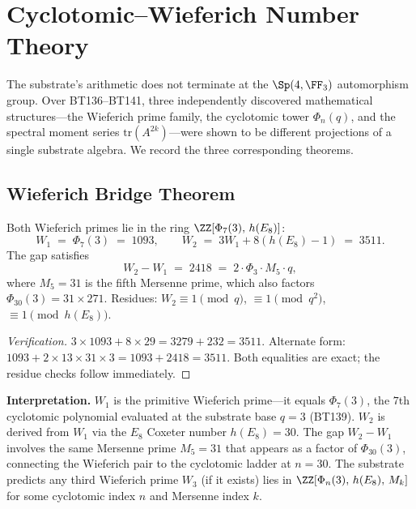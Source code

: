 
\section{Cyclotomic--Wieferich Number Theory}

The substrate's arithmetic does not terminate at the $\Sp(4,\FF_3)$ automorphism group.
Over BT136--BT141, three independently discovered mathematical structures---the Wieferich
prime family, the cyclotomic tower $\Phi_n(q)$, and the spectral moment series $\mathrm{tr}(A^{2k})$---were
shown to be different projections of a single substrate algebra. We record the three
corresponding theorems.

\subsection{Wieferich Bridge Theorem}

\begin{theorem}\label{thm:wieferich}
Both Wieferich primes lie in the ring $\ZZ[\Phi_7(3),\, h(E_8)]$:
\[
W_1 \;=\; \Phi_7(3) \;=\; 1093, \qquad
W_2 \;=\; 3W_1 + 8(h(E_8)-1) \;=\; 3511.
\]
The gap satisfies
\[
W_2 - W_1 \;=\; 2418 \;=\; 2\cdot\Phi_3\cdot M_5\cdot q,
\]
where $M_5 = 31$ is the fifth Mersenne prime, which also factors $\Phi_{30}(3) = 31\times 271$.
Residues: $W_2\equiv 1\pmod{q}$, $\equiv 1\pmod{q^2}$, $\equiv 1\pmod{h(E_8)}$.
\end{theorem}

\begin{proof}[Verification]
$3\times 1093 + 8\times 29 = 3279 + 232 = 3511$.  
Alternate form: $1093 + 2\times 13\times 31\times 3 = 1093 + 2418 = 3511$. Both equalities
are exact; the residue checks follow immediately.
\end{proof}

\noindent\textbf{Interpretation.} $W_1$ is the primitive Wieferich prime---it equals
$\Phi_7(3)$, the $7$th cyclotomic polynomial evaluated at the substrate base $q=3$ (BT139).
$W_2$ is derived from $W_1$ via the $E_8$ Coxeter number $h(E_8)=30$. The gap $W_2-W_1$
involves the same Mersenne prime $M_5=31$ that appears as a factor of $\Phi_{30}(3)$,
connecting the Wieferich pair to the cyclotomic ladder at $n=30$. The substrate predicts
any third Wieferich prime $W_3$ (if it exists) lies in $\ZZ[\Phi_n(3),\,h(E_8),\,M_k]$
for some cyclotomic index $n$ and Mersenne index $k$.

